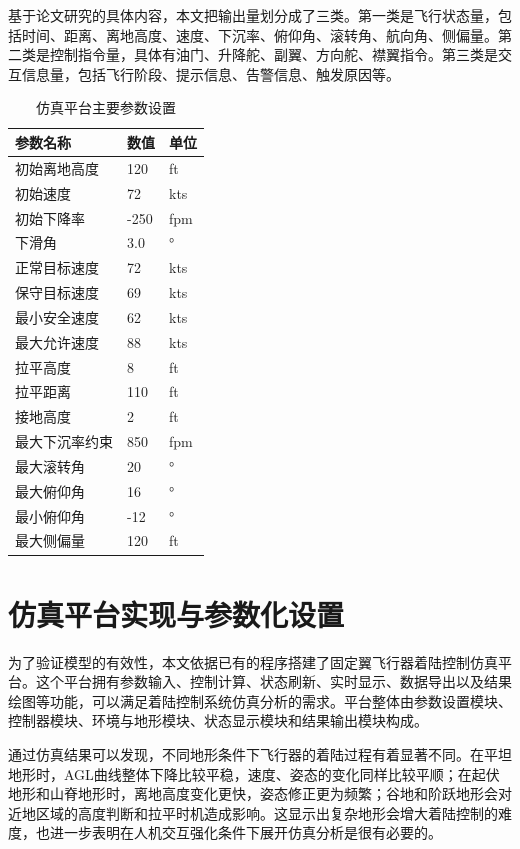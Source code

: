 基于论文研究的具体内容，本文把输出量划分成了三类。第一类是飞行状态量，包括时间、距离、离地高度、速度、下沉率、俯仰角、滚转角、航向角、侧偏量。第二类是控制指令量，具体有油门、升降舵、副翼、方向舵、襟翼指令。第三类是交互信息量，包括飞行阶段、提示信息、告警信息、触发原因等。

\begin{table}[H]
\centering
\caption{仿真平台主要参数设置}
\begin{tabular}{|l|l|l|}
\hline
\textbf{参数名称} & \textbf{数值} & \textbf{单位} \\
\hline
初始离地高度 & 120 & ft \\
\hline
初始速度 & 72 & kts \\
\hline
初始下降率 & -250 & fpm \\
\hline
下滑角 & 3.0 & ° \\
\hline
正常目标速度 & 72 & kts \\
\hline
保守目标速度 & 69 & kts \\
\hline
最小安全速度 & 62 & kts \\
\hline
最大允许速度 & 88 & kts \\
\hline
拉平高度 & 8 & ft \\
\hline
拉平距离 & 110 & ft \\
\hline
接地高度 & 2 & ft \\
\hline
最大下沉率约束 & 850 & fpm \\
\hline
最大滚转角 & 20 & ° \\
\hline
最大俯仰角 & 16 & ° \\
\hline
最小俯仰角 & -12 & ° \\
\hline
最大侧偏量 & 120 & ft \\
\hline
\end{tabular}
\end{table}

\section{仿真平台实现与参数化设置}

为了验证模型的有效性，本文依据已有的程序搭建了固定翼飞行器着陆控制仿真平台。这个平台拥有参数输入、控制计算、状态刷新、实时显示、数据导出以及结果绘图等功能，可以满足着陆控制系统仿真分析的需求。平台整体由参数设置模块、控制器模块、环境与地形模块、状态显示模块和结果输出模块构成。

通过仿真结果可以发现，不同地形条件下飞行器的着陆过程有着显著不同。在平坦地形时，AGL曲线整体下降比较平稳，速度、姿态的变化同样比较平顺；在起伏地形和山脊地形时，离地高度变化更快，姿态修正更为频繁；谷地和阶跃地形会对近地区域的高度判断和拉平时机造成影响。这显示出复杂地形会增大着陆控制的难度，也进一步表明在人机交互强化条件下展开仿真分析是很有必要的。

